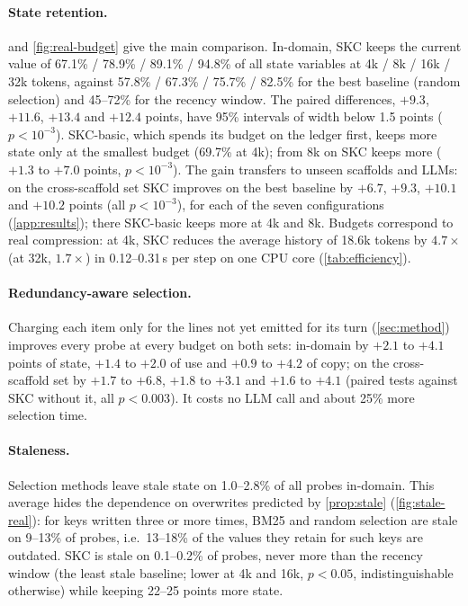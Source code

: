 \paragraph{State retention.}  and \cref{fig:real-budget} give the
main comparison. In-domain, SKC keeps the current value of 67.1\% / 78.9\% /
89.1\% / 94.8\% of all state variables at 4k / 8k / 16k / 32k tokens, against
57.8\% / 67.3\% / 75.7\% / 82.5\% for the best baseline (random selection) and
45--72\% for the recency window. The paired differences, $+9.3$, $+11.6$,
$+13.4$ and $+12.4$ points, have 95\% intervals of width below 1.5 points
($p<10^{-3}$). SKC-basic, which spends its budget on the ledger first, keeps
more state only at the smallest budget (69.7\% at 4k); from 8k on SKC keeps
more ($+1.3$ to $+7.0$ points, $p<10^{-3}$). The gain transfers to unseen
scaffolds and LLMs: on the cross-scaffold set SKC improves on the best baseline
by $+6.7$, $+9.3$, $+10.1$ and $+10.2$ points (all $p<10^{-3}$), for each of the
seven configurations (\cref{app:results}); there SKC-basic keeps more at 4k and
8k. Budgets correspond to real compression: at 4k, SKC reduces the average
history of 18.6k tokens by $4.7\times$ (at 32k, $1.7\times$) in 0.12--0.31\,s
per step on one CPU core (\cref{tab:efficiency}).

\paragraph{Redundancy-aware selection.} Charging each item only for the lines
not yet emitted for its turn (\cref{sec:method}) improves every probe at every
budget on both sets: in-domain by $+2.1$ to $+4.1$ points of state, $+1.4$ to
$+2.0$ of use and $+0.9$ to $+4.2$ of copy; on the cross-scaffold set by
$+1.7$ to $+6.8$, $+1.8$ to $+3.1$ and $+1.6$ to $+4.1$ (paired tests against
SKC without it, all $p<0.003$). It costs no LLM call and about 25\% more
selection time.

\paragraph{Staleness.} Selection methods leave stale state on 1.0--2.8\% of all
probes in-domain. This average hides the dependence on overwrites predicted by
\cref{prop:stale} (\cref{fig:stale-real}): for keys written three or more
times, BM25 and random selection are stale on 9--13\% of probes, i.e.\ 13--18\%
of the values they retain for such keys are outdated. SKC is stale on
0.1--0.2\% of probes, never more than the recency window (the least stale
baseline; lower at 4k and 16k, $p<0.05$, indistinguishable otherwise) while
keeping 22--25 points more state.

